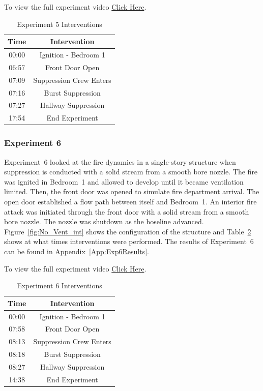 \documentclass[12pt,oneside]{book}
\begin{document}
To view the full experiment video \href{https://player.vimeo.com/video/170511425?autoplay=1}{Click Here}.

\begin{table}[!ht]
	\centering
	\caption{Experiment 5 Interventions}
	\begin{tabular}{|c|c|} 
		\hline
		Time & Intervention \\ \hline \hline
		00:00 & Ignition - Bedroom 1 \\ \hline
		06:57 & Front Door Open \\ \hline
		07:09 & Suppression Crew Enters\\ \hline
		07:16 & Burst Suppression \\ \hline 
		07:27 & Hallway Suppression \\ \hline
		17:54 & End Experiment\\ \hline
	\end{tabular}
	\label{Table:Exp5Interventions}
\end{table}

\FloatBarrier
\clearpage

\subsubsection{Experiment 6}
Experiment~6 looked at the fire dynamics in a single-story structure when suppression is conducted with a solid stream from a smooth bore nozzle. The fire was ignited in Bedroom~1 and allowed to develop until it became ventilation limited. Then, the front door was opened to simulate fire department arrival. The open door established a flow path between itself and Bedroom~1. An interior fire attack was initiated through the front door with a solid stream from a smooth bore nozzle. The nozzle was shutdown as the hoseline advanced. Figure~\ref{fig:No_Vent_int} shows the configuration of the structure and Table~\ref{Table:Exp6Interventions} shows at what times interventions were performed. The results of Experiment~6 can be found in Appendix~\ref{App:Exp6Results}. 

To view the full experiment video \href{https://player.vimeo.com/video/170510936?autoplay=1}{Click Here}.

\begin{table}[!ht]
	\centering
	\caption{Experiment 6 Interventions}
	\begin{tabular}{|c|c|} 
		\hline
		Time & Intervention \\ \hline \hline
		00:00 & Ignition - Bedroom 1 \\ \hline
		07:58 & Front Door Open \\ \hline
		08:13 & Suppression Crew Enters\\ \hline
		08:18 & Burst Suppression \\ \hline 
		08:27 & Hallway Suppression \\ \hline
		14:38 & End Experiment\\ \hline
	\end{tabular}
	\label{Table:Exp6Interventions}
\end{table}
\end{document}
